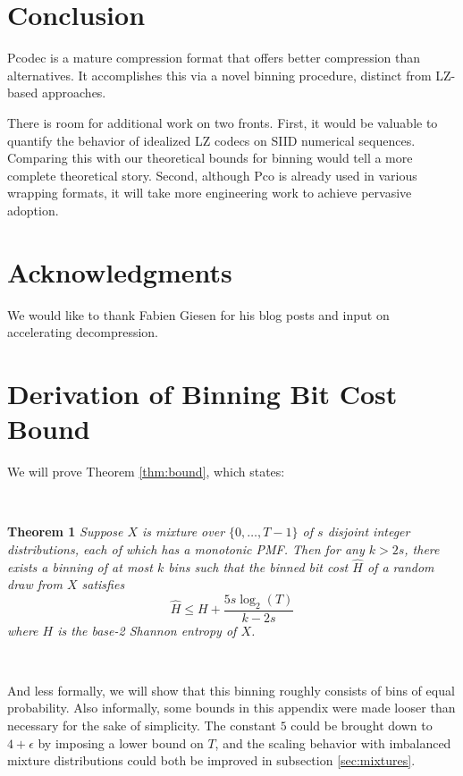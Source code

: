 \documentclass[letterpaper]{article}
\begin{document}
\section{Conclusion}

Pcodec is a mature compression format that offers better compression than alternatives.
It accomplishes this via a novel binning procedure, distinct from LZ-based approaches.

There is room for additional work on two fronts.
First, it would be valuable to quantify the behavior of idealized LZ codecs on SIID numerical sequences.
Comparing this with our theoretical bounds for binning would tell a more complete theoretical story.
Second, although Pco is already used in various wrapping formats, it will take more engineering work to achieve pervasive adoption.

\section{Acknowledgments}

We would like to thank Fabien Giesen for his blog posts and input on accelerating decompression.




\appendix

\section{Derivation of Binning Bit Cost Bound}
\label{sec:theoretical_bound}

We will prove Theorem \ref{thm:bound}, which states:

\

\textbf{Theorem 1} \emph{
   Suppose $X$ is mixture over $\{0, \ldots, T - 1\}$ of $s$ disjoint integer distributions, each of which has a monotonic PMF.
  Then for any $k>2s$, there exists a binning of at most $k$ bins such that the binned bit cost $\hat{H}$ of a random draw from $X$ satisfies
\[\hat{H} \le H + \frac{5s\log_2(T)}{k-2s}\]
where $H$ is the base-2 Shannon entropy of $X$.
}

\

And less formally, we will show that this binning roughly consists of bins of equal probability.
Also informally, some bounds in this appendix were made looser than necessary for the sake of simplicity.
The constant $5$ could be brought down to $4 + \epsilon$ by imposing a lower bound on $T$, and the scaling behavior with imbalanced mixture distributions could both be improved in subsection \ref{sec:mixtures}.
\end{document}
